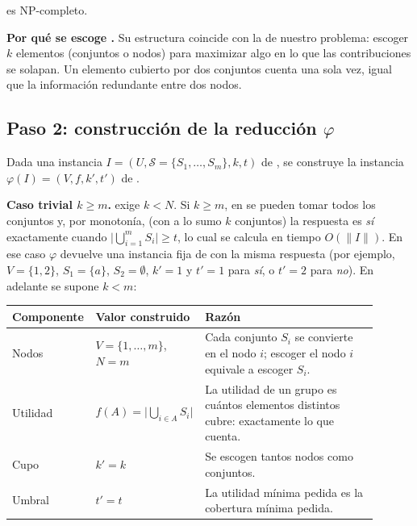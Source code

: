 \begin{lema}\label{lem:mc}
\MC{} es NP-completo.
\end{lema}

\textbf{Por qué se escoge \MC.} Su estructura coincide con la de nuestro problema: escoger $k$ elementos (conjuntos o nodos) para maximizar algo en lo que las contribuciones se solapan. Un elemento cubierto por dos conjuntos cuenta una sola vez, igual que la información redundante entre dos nodos.

\subsection{Paso 2: construcción de la reducción \texorpdfstring{$\varphi$}{phi}}

Dada una instancia $I=(U,\mathcal S=\{S_1,\dots,S_m\},k,t)$ de \MC, se construye la instancia $\varphi(I)=(V,f,k',t')$ de \SEL.

\textbf{Caso trivial $k\ge m$.} \SEL{} exige $k<N$. Si $k\ge m$, en \MC{} se pueden tomar todos los conjuntos y, por monotonía, (con a lo sumo $k$ conjuntos) la respuesta es \emph{sí} exactamente cuando $\big|\bigcup_{i=1}^m S_i\big|\ge t$, lo cual se calcula en tiempo $O(\|I\|)$. En ese caso $\varphi$ devuelve una instancia fija de \SEL{} con la misma respuesta (por ejemplo, $V=\{1,2\}$, $S_1=\{a\}$, $S_2=\emptyset$, $k'=1$ y $t'=1$ para \emph{sí}, o $t'=2$ para \emph{no}). En adelante se supone $k<m$:

\begin{center}
\renewcommand{\arraystretch}{1.3}
\begin{tabular}{p{0.16\linewidth}p{0.27\linewidth}p{0.47\linewidth}}
\toprule
\rowcolor{uccielo} \textbf{Componente} & \textbf{Valor construido} & \textbf{Razón} \\
\midrule
Nodos & $V=\{1,\dots,m\}$, $N=m$ & Cada conjunto $S_i$ se convierte en el nodo $i$; escoger el nodo $i$ equivale a escoger $S_i$. \\
Utilidad & $f(A)=\Big|\bigcup_{i\in A}S_i\Big|$ & La utilidad de un grupo es cuántos elementos distintos cubre: exactamente lo que \MC{} cuenta. \\
Cupo & $k'=k$ & Se escogen tantos nodos como conjuntos. \\
Umbral & $t'=t$ & La utilidad mínima pedida es la cobertura mínima pedida. \\
\bottomrule
\end{tabular}
\end{center}

